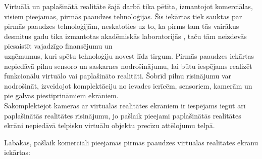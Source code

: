 \documentclass[12pt, a4paper, oneside, openright]{article}
\begin{document}
\par
Virtuālā un paplašinātā realitāte šajā darbā tika pētīta, izmantojot komerciālas,
visiem pieejamas, pirmās paaudzes 
tehnoloģijas. Šīs iekārtas tiek sauktas par pirmās paaudzes tehnoloģijām, neskatoties
uz to, ka pirms tam tās vairākus desmitus gadu tika izmantotas akadēmiskās laboratorijās
, taču tām neizdevās piesaistīt vajadzīgo finansējumu un \\ uzņēmumus, kuri spētu tehnoloģiju
novest līdz tirgum. Pirmās paaudzes iekārtas nepiedāvā pilnu sensoro un saskarnes nodrošinājumu, 
lai būtu iespējams realizēt funkcionālu virtuālo vai paplašināto realitāti.
Šobrīd pilnu risinājumu var nodrošināt, izveidojot komplektāciju no ievades ierīcēm, sensoriem, kamerām
un pie galvas piestiprināmiem ekrāniem. \\
Sakomplektējot kameras ar virtuālās realitātes ekrāniem ir iespējams iegūt arī paplašinātās
realitātes risinājumu, jo pašlaik pieejami paplašinātās realitātes ekrāni nepiedāvā telpisku 
virtuālu objektu precīzu attēlojumu telpā.
\par
Labākās, pašlaik komerciāli pieejamās pirmās paaudzes virtuālās realitātes ekrānu iekārtas:
\end{document}

